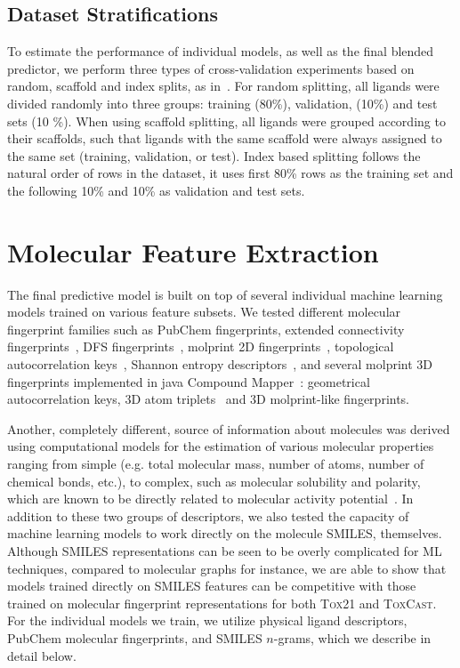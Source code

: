 \documentclass[11pt,a4paper]{article}
\begin{document}
\subsection{Dataset Stratifications}
\label{sec:splits}
To estimate the performance of individual models, as well as the final 
blended predictor, we perform three types of cross-validation experiments based
on random, scaffold and index splits, as in~\cite{Wu:2017}.
For random splitting, all ligands were divided randomly into three groups: 
training (80\%), validation, (10\%) and test sets (10 \%). 
When using scaffold splitting, all ligands were grouped according to their
scaffolds, such that ligands with the same scaffold were always assigned to 
the same set (training, validation, or test). Index based splitting follows the natural order of rows in the
dataset, it uses first 80\% rows as the training set and the following 10\% and 10\% as
validation and test sets.  


\section{Molecular Feature Extraction}
\label{sec:features}
The final predictive model is built on top of several individual machine
learning models trained on various feature subsets. We tested different 
molecular fingerprint families such as PubChem fingerprints, 
extended connectivity fingerprints~\cite{Rogers:2010aa}, 
DFS fingerprints~\cite{Ralaivola:2005aa},
molprint 2D fingerprints~\cite{Bender:2005aa}, 
topological autocorrelation keys~\cite{Schneider:1999aa}, 
Shannon entropy descriptors~\cite{Gregori-Puigjane:2006aa}, 
and several molprint 3D fingerprints implemented in 
java Compound Mapper~\cite{Hinselmann:2011aa}: geometrical autocorrelation keys, 
3D atom triplets~\cite{Mahe:2006aa} and 3D molprint-like fingerprints. 

Another, completely different,
source of information about molecules was derived using computational
models for the estimation of various molecular properties ranging from simple 
(e.g. total molecular mass, number of atoms, number of chemical bonds, etc.), 
to complex, such as molecular solubility and polarity, which are 
known to be
directly related to molecular activity potential~\cite{Alsenz:2007aa}. In addition to these
two groups of descriptors, we also tested the capacity of machine learning
models to work directly on the molecule SMILES, themselves. Although SMILES
representations can be seen to be overly complicated for ML techniques, compared to
molecular graphs for instance, 
we are able to show that models trained directly on SMILES features can be competitive
with those trained on molecular fingerprint representations for both 
\textsc{Tox21} and \textsc{ToxCast}. For the individual models we train, we 
utilize physical ligand descriptors, PubChem molecular fingerprints, and 
SMILES $n$-grams, which we describe in detail below.
\end{document}
